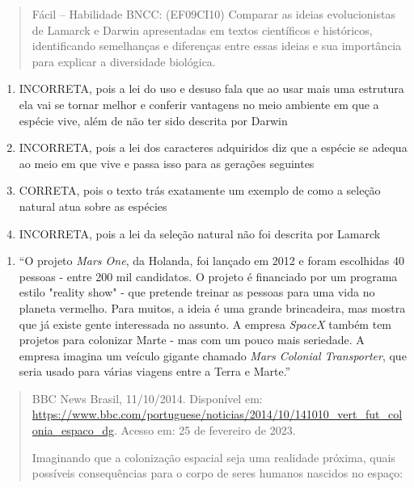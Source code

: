 \begin{quote}
Fácil -- Habilidade BNCC: (EF09CI10) Comparar as ideias evolucionistas
de Lamarck e Darwin apresentadas em textos científicos e históricos,
identificando semelhanças e diferenças entre essas ideias e sua
importância para explicar a diversidade biológica.
\end{quote}

\begin{enumerate}
\def\labelenumi{(\Alph{enumi})}
\item
  INCORRETA, pois a lei do uso e desuso fala que ao usar mais uma
  estrutura ela vai se tornar melhor e conferir vantagens no meio
  ambiente em que a espécie vive, além de não ter sido descrita por
  Darwin
\item
  INCORRETA, pois a lei dos caracteres adquiridos diz que a espécie se
  adequa ao meio em que vive e passa isso para as gerações seguintes
\item
  CORRETA, pois o texto trás exatamente um exemplo de como a seleção
  natural atua sobre as espécies
\item
  INCORRETA, pois a lei da seleção natural não foi descrita por Lamarck
\end{enumerate}

\begin{enumerate}
\def\labelenumi{\arabic{enumi})}
\item
  ``O projeto \emph{Mars One}, da Holanda, foi lançado em 2012 e foram
  escolhidas 40 pessoas - entre 200 mil candidatos. O projeto é
  financiado por um programa estilo "reality show" - que pretende
  treinar as pessoas para uma vida no planeta vermelho. Para muitos, a
  ideia é uma grande brincadeira, mas mostra que já existe gente
  interessada no assunto. A empresa \emph{SpaceX} também tem projetos
  para colonizar Marte - mas com um pouco mais seriedade. A empresa
  imagina um veículo gigante chamado \emph{Mars Colonial Transporter},
  que seria usado para várias viagens entre a Terra e Marte.''
\end{enumerate}

\begin{quote}
BBC News Brasil, 11/10/2014. Disponível em:
\url{https://www.bbc.com/portuguese/noticias/2014/10/141010_vert_fut_colonia_espaco_dg}.
Acesso em: 25 de fevereiro de 2023.

Imaginando que a colonização espacial seja uma realidade próxima, quais
possíveis consequências para o corpo de seres humanos nascidos no
espaço:
\end{quote}

